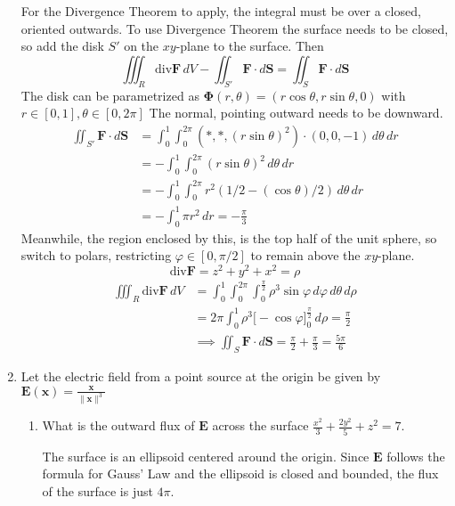 \documentclass{article}
\newcommand{\norm}[1]{\| #1 \|}
\newcommand{\divt}{\text{div}}
\begin{document}
\begin{enumerate}
    For the Divergence Theorem to apply, the integral must be over a closed, oriented outwards. To use Divergence Theorem the surface needs to be closed, so add the disk $S'$ on the $xy$-plane to the surface. Then
    \[\iiint_R \divt \boldsymbol F \, dV - \iint_{S'} \boldsymbol F \cdot d \boldsymbol S = \iint_S \boldsymbol F \cdot d\boldsymbol S\]
    The disk can be parametrized as $\boldsymbol \Phi (r, \theta) = (r\cos \theta, r\sin \theta, 0)$ with $r \in [0,1], \theta \in [0,2\pi]$ The normal, pointing outward needs to be downward.
    \begin{align*} 
        \iint_{S'} \boldsymbol F \cdot d \boldsymbol S &= \int_0^1 \int_0^{2\pi} (*,*,(r\sin \theta)^2) \cdot (0,0,-1) \, d \theta \,d r \\
        &= - \int_0^1 \int_0^{2\pi} (r\sin \theta)^2 \, d \theta \,d r \\
        &= - \int_0^1 \int_0^{2\pi} r^2 (1/2 - (\cos \theta)/2) \, d \theta \,d r \\
        &= - \int_0^1 \pi r^2 \,d r = - \frac{\pi}{3}
    \end{align*}
    Meanwhile, the region enclosed by this, is the top half of the unit sphere, so switch to polars, restricting $\varphi \in [0,\pi/2]$ to remain above the $xy$-plane.
    \[\divt \boldsymbol F = z^2 + y^2 + x^2 = \rho\]
    \begin{align*} 
        \iiint_R \divt \boldsymbol F \, dV &= \int_0^1 \int_0^{2\pi} \int_0^{\frac{\pi}{2}} \rho^3 \sin\varphi \, d\varphi \, d\theta \, d \rho \\
        &= 2\pi \int_0^1 \rho^3 \big[ -\cos\varphi\big]_0^{\frac{\pi}{2}} \, d \rho = \frac{\pi}{2} \\
        & \implies \iint_S \boldsymbol F \cdot d \boldsymbol S = \frac{\pi}{2} + \frac{\pi}{3} = \frac{5\pi}{6}
    \end{align*}


\newpage
\item Let the electric field from a point source at the origin be given by $\displaystyle \boldsymbol E (\boldsymbol x) = \frac{\boldsymbol x}{\norm{\boldsymbol x}^3}$
    \begin{enumerate}
        \item What is the outward flux of $\boldsymbol E$ across the surface $\displaystyle \frac{x^2}{3} + \frac{2y^2}{5} + z^2 = 7$. 
            
            The surface is an ellipsoid centered around the origin. Since $\boldsymbol E$ follows the formula for Gauss' Law and the ellipsoid is closed and bounded, the flux of the surface is just $4\pi$.


\end{enumerate}
\end{enumerate}
\end{document}
